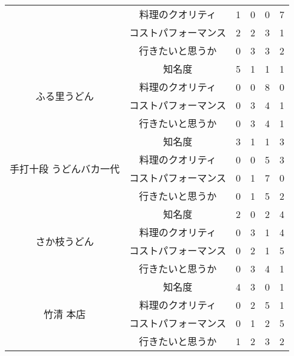 \begin{table}[H]
{\begin{tabular}{|c|c|r|r|r|r|}
 & 料理のクオリティ & 1 & 0 & 0 & 7 \\ \cline{2-6} 
 & コストパフォーマンス & 2 & 2 & 3 & 1 \\ \cline{2-6} 
 & 行きたいと思うか & 0 & 3 & 3 & 2 \\ \hline
\multirow{4}{*}{ふる里うどん} & 知名度 & 5 & 1 & 1 & 1 \\ \cline{2-6} 
 & 料理のクオリティ & 0 & 0 & 8 & 0 \\ \cline{2-6} 
 & コストパフォーマンス & 0 & 3 & 4 & 1 \\ \cline{2-6} 
 & 行きたいと思うか & 0 & 3 & 4 & 1 \\ \hline
\multirow{4}{*}{手打十段 うどんバカ一代} & 知名度 & 3 & 1 & 1 & 3 \\ \cline{2-6} 
 & 料理のクオリティ & 0 & 0 & 5 & 3 \\ \cline{2-6} 
 & コストパフォーマンス & 0 & 1 & 7 & 0 \\ \cline{2-6} 
 & 行きたいと思うか & 0 & 1 & 5 & 2 \\ \hline
\multirow{4}{*}{さか枝うどん} & 知名度 & 2 & 0 & 2 & 4 \\ \cline{2-6} 
 & 料理のクオリティ & 0 & 3 & 1 & 4 \\ \cline{2-6} 
 & コストパフォーマンス & 0 & 2 & 1 & 5 \\ \cline{2-6} 
 & 行きたいと思うか & 0 & 3 & 4 & 1 \\ \hline
\multirow{4}{*}{竹清 本店} & 知名度 & 4 & 3 & 0 & 1 \\ \cline{2-6} 
 & 料理のクオリティ & 0 & 2 & 5 & 1 \\ \cline{2-6} 
 & コストパフォーマンス & 0 & 1 & 2 & 5 \\ \cline{2-6} 
 & 行きたいと思うか & 1 & 2 & 3 & 2 \\ \hline
\end{tabular}
}
\end{table}
